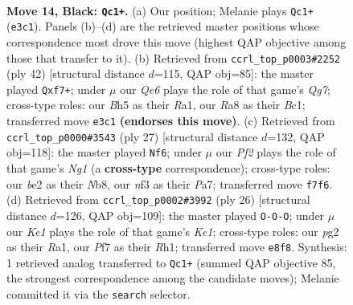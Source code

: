 \documentclass[11pt]{article}
\begin{document}
\clearpage

\begin{figure}[p]\centering
\begin{subfigure}{0.46\textwidth}\centering
\resizebox{\linewidth}{!}{%
\newchessgame
\chessboard[
  setfen={rn2k1nr/1Q3ppp/p7/4P2b/7P/1P2qN2/P3B1P1/RN2K2R b KQkq - 0 14},
  showmover=false,
  pgfstyle=straightmove, color=movearrow, markmove={e3-c1}
]}
\caption{}
\end{subfigure}\hfill
\begin{subfigure}{0.46\textwidth}\centering
\resizebox{\linewidth}{!}{%
\newchessgame
\chessboard[
  setfen={4r3/1k3pQp/p2r1n2/2b1p3/P3P3/1p6/1PqN1PPP/R1B1R1K1 w - - 1 22},
  showmover=false,
  pgfstyle=straightmove, color=movearrow, markmove={g7-f7}
]}
\caption{}
\end{subfigure}
\\[4pt]
\begin{subfigure}{0.46\textwidth}\centering
\resizebox{\linewidth}{!}{%
\newchessgame
\chessboard[
  setfen={Qn2k1nr/p4p1p/2pP4/3p3b/3P1p2/2N2P2/Pq2NKPP/5B1R b k - 0 14},
  showmover=false,
  pgfstyle=straightmove, color=movearrow, markmove={g8-f6}
]}
\caption{}
\end{subfigure}\hfill
\begin{subfigure}{0.46\textwidth}\centering
\resizebox{\linewidth}{!}{%
\newchessgame
\chessboard[
  setfen={r3k2r/ppQn1ppp/3p4/8/4qP2/4B3/PPP3PP/R3K2R w KQkq - 0 14},
  showmover=false,
  pgfstyle=straightmove, color=movearrow, markmove={e1-c1}
]}
\caption{}
\end{subfigure}
\caption{\textbf{Move 14, Black: \texttt{Qc1+}.} (a) Our position; Melanie plays \texttt{Qc1+} (\texttt{e3c1}). Panels (b)--(d) are the retrieved master positions whose correspondence most drove this move (highest QAP objective among those that transfer to it). (b) Retrieved from \texttt{ccrl\_top\_p0003\#2252} (ply 42) [structural distance $d$=115, QAP obj=85]: the master played \texttt{Qxf7+}; under $\mu$ our \emph{Qe6} plays the role of that game's \emph{Qg7}; cross-type roles: our \emph{B}h5 as their \emph{R}a1, our \emph{R}a8 as their \emph{B}c1; transferred move \texttt{e3c1} \textbf{(endorses this move)}. (c) Retrieved from \texttt{ccrl\_top\_p0000\#3543} (ply 27) [structural distance $d$=132, QAP obj=118]: the master played \texttt{Nf6}; under $\mu$ our \emph{Pf2} plays the role of that game's \emph{Ng1} (a \textbf{cross-type} correspondence); cross-type roles: our \emph{b}e2 as their \emph{N}b8, our \emph{n}f3 as their \emph{P}a7; transferred move \texttt{f7f6}. (d) Retrieved from \texttt{ccrl\_top\_p0002\#3992} (ply 26) [structural distance $d$=126, QAP obj=109]: the master played \texttt{O-O-O}; under $\mu$ our \emph{Ke1} plays the role of that game's \emph{Ke1}; cross-type roles: our \emph{p}g2 as their \emph{R}a1, our \emph{P}f7 as their \emph{R}h1; transferred move \texttt{e8f8}. Synthesis: 1 retrieved analog transferred to \texttt{Qc1+} (summed QAP objective 85, the strongest correspondence among the candidate moves); Melanie committed it via the \texttt{search} selector.}
\label{fig:thought-m27}
\end{figure}
\end{document}
